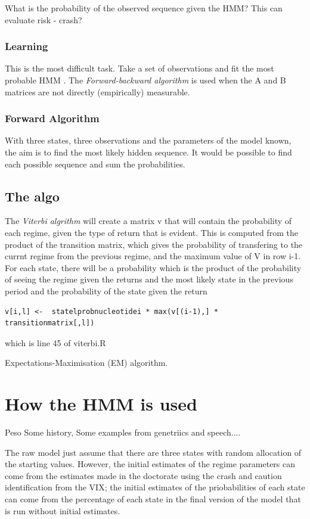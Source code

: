 \documentclass[12pt, a4paper, oneside]{article} %
\begin{document}
What is the probability of the observed sequence given the HMM? This can evaluate risk - crash? 

\subsubsection{Learning}
This is the most difficult task.  Take a set of observations and fit the most probable HMM . The \emph{Forward-backward algorithm} is used when the A and B matrices are not directly (empirically) measurable.  

\subsubsection{Forward Algorithm}
With three states, three observations and the parameters of the model known, the aim is to find the most likely hidden sequence.  It would be possible to find each possible sequence and sum the probabilities.  





\subsection{The algo}
The \emph{Viterbi algrithm} will create a matrix v that will contain the probability of each regime, given the type of return that is evident. This is computed from the product of the transition matrix, which gives the probability of transfering to the currnt regime from the previous regime, and the maximum value of V in row i-1.  For each state, there will be a probability which is the product of the probability of seeing the regime given the returns and the most likely state in the previous period and the probability of the state given the return \begin{verbatim}v[i,l] <-  statelprobnucleotidei * max(v[(i-1),] * transitionmatrix[,l])\end{verbatim} which is line 45 of viterbi.R

Expectations-Maximisation (EM) algorithm. 


\section{How the HMM is used}
Peso
Some history, 
Some examples from genetriics and speech....

The raw model just assume that there are three states with random allocation of the starting values.  However, the initial estimates of the regime parameters can come from the estimates made in the doctorate using the crash and caution identification from the VIX; the initial estimates of the priobabilities of each state can come from the percentage of each state in the final version of the model that is run without initial estimates.  
\end{document}
